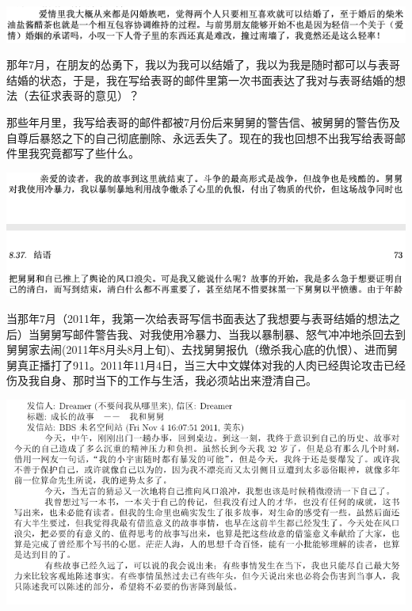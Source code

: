 \documentclass[9pt, b5paper]{article}
\begin{document}
\begin{center}
\includegraphics[width=.9\linewidth]{./pic/p1p63.png}
\end{center}

那年7月，在朋友的怂勇下，我以为我可以结婚了，我以为我是随时都可以与表哥结婚的状态，于是，我在写给表哥的邮件里第一次书面表达了我对与表哥结婚的想法（去征求表哥的意见）？

那些年月里，我写给表哥的邮件都被7月份后来舅舅的警告信、被舅舅的警告伤及自尊后暴怒之下的自己彻底删除、永远丢失了。现在的我也回想不出我写给表哥邮件里我究竟都写了些什么。

\begin{center}
\includegraphics[width=.9\linewidth]{./pic/p1p73.png}
\end{center}

当那年7月（2011年，我第一次给表哥写信书面表达了我想要与表哥结婚的想法之后）当舅舅写邮件警告我、对我使用冷暴力、当我以暴制暴、怒气冲冲地杀回去到舅舅家去闹(2011年8月头8月上旬)、去找舅舅报仇（缴杀我心底的仇恨）、进而舅舅真正播打了911。2011年11月4日，当三大中文媒体对我的人肉已经舆论攻击已经伤及我自身、那时当下的工作与生活，我必须站出来澄清自己。

\begin{center}
\includegraphics[width=.9\linewidth]{./pic/dreamer1.png}
\end{center}
\end{document}

